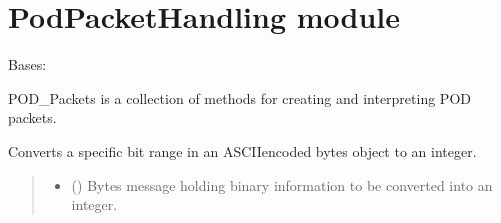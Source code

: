\documentclass[letterpaper,10pt,english]{sphinxmanual}
\begin{document}
\sphinxstepscope


\section{PodPacketHandling module}
\label{\detokenize{PodPacketHandling:module-PodPacketHandling}}\label{\detokenize{PodPacketHandling:podpackethandling-module}}\label{\detokenize{PodPacketHandling::doc}}

\begin{fulllineitems}
\label{\detokenize{PodPacketHandling:PodPacketHandling.POD_Packets}}
\pysigstartsignatures
{}
\pysigstopsignatures
\sphinxAtStartPar
Bases: 

\sphinxAtStartPar
POD\_Packets is a collection of methods for creating and interpreting POD packets.

\begin{fulllineitems}
\label{\detokenize{PodPacketHandling:PodPacketHandling.POD_Packets.ASCIIbytesToInt_Split}}
\pysigstartsignatures
{}
\pysigstopsignatures
\sphinxAtStartPar
Converts a specific bit range in an ASCII\sphinxhyphen{}encoded bytes object to an integer.
\begin{quote}\begin{description}
\begin{itemize}
\item {} 
\sphinxAtStartPar
{} () \textendash{} Bytes message holding binary information to be converted into an integer.


\end{itemize}
\end{description}
\end{quote}
\end{fulllineitems}
\end{fulllineitems}
\end{document}
